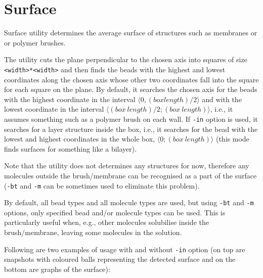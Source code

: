\section{Surface} \label{sec:Surface}

Surface utility determines the average surface of structures such as
membranes or or polymer brushes.

The utility cuts the plane perpendicular to the chosen axis into squares of
size \texttt{<width>*<width>} and then finds the beads with the highest and
lowest coordinates along the chosen axis whose other two coordinates fall
into the square for each square on the plane. By default, it searches the
chosen axis for the beads with the highest coordinate in the interval
$\langle0, (box length)/2\rangle$ and with the lowest coordinate in the
interval $\langle(box\ length)/2; (box\ length)\rangle$, i.e., it assumes
something such as a polymer brush on each wall. If \texttt{-in}
option is used, it searches for a layer structure inside the box, i.e., it
searches for the bead with the lowest and highest coordinates in the whole
box, $\langle0; (box\ length)\rangle$ (this mode finds surfaces for
something like a bilayer).

Note that the utility does not determines any structures for now, therefore
any molecules outside the brush/membrane can be recognised as a part of the
surface (\texttt{-bt} and \texttt{-m} can be sometimes used to eliminate
this problem).

By default, all bead types and all molecule types are used, but using
\texttt{-bt} and \texttt{-m} options, only specified bead and/or molecule
types can be used. This is particularly useful when, e.g., other molecules
solubilise inside the brush/membrane, leaving some molecules in the
solution.

Following are two examples of usage with and without \texttt{-in} option
(on top are snapshots with coloured balls representing the detected surface
and on the bottom are graphs of the surface):

